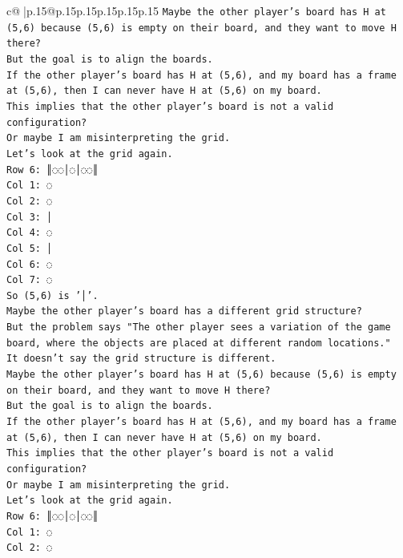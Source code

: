 \documentclass{article}
\begin{document}
{\begin{supertabular}{c@{$\;$}|p{.15\linewidth}@{}p{.15\linewidth}p{.15\linewidth}p{.15\linewidth}p{.15\linewidth}p{.15\linewidth}}
{{{\texttt{Maybe the other player's board has H at (5,6) because (5,6) is empty on their board, and they want to move H there?} \\
\texttt{But the goal is to align the boards.} \\
\texttt{If the other player's board has H at (5,6), and my board has a frame at (5,6), then I can never have H at (5,6) on my board.} \\
\texttt{This implies that the other player's board is not a valid configuration?} \\
\texttt{Or maybe I am misinterpreting the grid.} \\
\texttt{Let's look at the grid again.} \\
\texttt{Row 6: ║◌◌│◌│◌◌║} \\
\texttt{Col 1: ◌} \\
\texttt{Col 2: ◌} \\
\texttt{Col 3: │} \\
\texttt{Col 4: ◌} \\
\texttt{Col 5: │} \\
\texttt{Col 6: ◌} \\
\texttt{Col 7: ◌} \\
\texttt{So (5,6) is '│'.} \\
\texttt{Maybe the other player's board has a different grid structure?} \\
\texttt{But the problem says "The other player sees a variation of the game board, where the objects are placed at different random locations."} \\
\texttt{It doesn't say the grid structure is different.} \\
\texttt{Maybe the other player's board has H at (5,6) because (5,6) is empty on their board, and they want to move H there?} \\
\texttt{But the goal is to align the boards.} \\
\texttt{If the other player's board has H at (5,6), and my board has a frame at (5,6), then I can never have H at (5,6) on my board.} \\
\texttt{This implies that the other player's board is not a valid configuration?} \\
\texttt{Or maybe I am misinterpreting the grid.} \\
\texttt{Let's look at the grid again.} \\
\texttt{Row 6: ║◌◌│◌│◌◌║} \\
\texttt{Col 1: ◌} \\
\texttt{Col 2: ◌} \\
}}}
\end{supertabular}}
\end{document}

